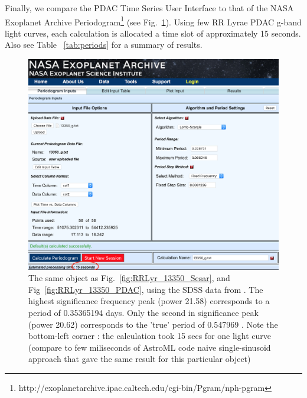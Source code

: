 \documentclass[DM,lsstdraft,toc]{lsstdoc}
\begin{document}
Finally, we compare the PDAC Time Series User Interface to that of the  NASA Exoplanet Archive Periodogram\footnote{http://exoplanetarchive.ipac.caltech.edu/cgi-bin/Pgram/nph-pgram} (see Fig.~\ref{fig:exoplanet_archive}). Using few RR Lyrae PDAC g-band  light curves, each calculation is allocated a time slot of approximately 15 seconds. Also see Table ~\ref{tab:periods} for a summary of results.

\begin{figure}
\includegraphics[width=\textwidth]{figs/Exoplanet_archive_periodogram}
\caption{ The same object as Fig.~\ref{fig:RRLyr_13350_Sesar}, and Fig~\ref{fig:RRLyr_13350_PDAC},  using  the SDSS data from \citep{2010ApJ...708..717S}.  The highest significance frequency peak (power 21.58) corresponds to  a period of 0.35365194 days. Only the second in significance peak (power 20.62) corresponds to the 'true' period of 0.547969 \citep{2010ApJ...708..717S}. Note the bottom-left corner : the calculation took 15 secs for one light curve (compare to few miliseconds of AstroML code naive single-sinusoid approach that gave the same result for this particular object) }
\label{fig:exoplanet_archive}
\end{figure}



\end{document}
